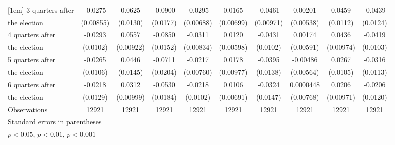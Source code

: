\begin{table}[!ht]
\begin{tabular}{l*{9}{c}}
[1em]
 3 quarters after &     -0.0275\sym{**} &      0.0625\sym{***}&     -0.0900\sym{***}&     -0.0295\sym{***}&      0.0165\sym{*}  &     -0.0461\sym{***}&     0.00201         &      0.0459\sym{***}&     -0.0439\sym{***}\\
 the election                   &   (0.00855)         &    (0.0130)         &    (0.0177)         &   (0.00688)         &   (0.00699)         &   (0.00971)         &   (0.00538)         &    (0.0112)         &    (0.0124)         \\
[1em]
 4 quarters after &     -0.0293\sym{**} &      0.0557\sym{***}&     -0.0850\sym{***}&     -0.0311\sym{***}&      0.0120\sym{*}  &     -0.0431\sym{***}&     0.00174         &      0.0436\sym{***}&     -0.0419\sym{***}\\
 the election                   &    (0.0102)         &   (0.00922)         &    (0.0152)         &   (0.00834)         &   (0.00598)         &    (0.0102)         &   (0.00591)         &   (0.00974)         &    (0.0103)         \\
[1em]
 5 quarters after &     -0.0265\sym{*}  &      0.0446\sym{**} &     -0.0711\sym{***}&     -0.0217\sym{**} &      0.0178         &     -0.0395\sym{**} &    -0.00486         &      0.0267\sym{*}  &     -0.0316\sym{**} \\
 the election                   &    (0.0106)         &    (0.0145)         &    (0.0204)         &   (0.00760)         &   (0.00977)         &    (0.0138)         &   (0.00564)         &    (0.0105)         &    (0.0113)         \\
[1em]
 6 quarters after &     -0.0218         &      0.0312\sym{**} &     -0.0530\sym{**} &     -0.0218\sym{*}  &      0.0106         &     -0.0324\sym{*}  &   0.0000448         &      0.0206\sym{*}  &     -0.0206         \\
 the election                   &    (0.0129)         &   (0.00999)         &    (0.0184)         &    (0.0102)         &   (0.00691)         &    (0.0147)         &   (0.00768)         &   (0.00971)         &    (0.0120)         \\
\hline
Observations        &       12921         &       12921         &       12921         &       12921         &       12921         &       12921         &       12921         &       12921         &       12921         \\
\hline\hline
\multicolumn{10}{l}{\footnotesize Standard errors in parentheses}\\
\multicolumn{10}{l}{\footnotesize \sym{*} \(p<0.05\), \sym{**} \(p<0.01\), \sym{***} \(p<0.001\)}\\
\end{tabular}
\end{table}
